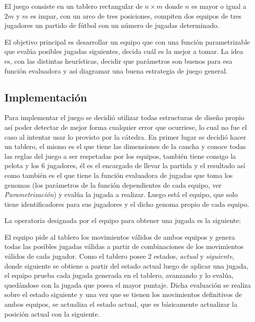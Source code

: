 
El juego consiste en un tablero rectangular de $n \times m$ donde $n$ es mayor o
igual a $2m$ y $m$ es impar, con un arco de tres posiciones, compiten dos
equipos de tres jugadores un partido de fútbol con un número de jugadas
determinado.


El objetivo principal es desarrollar un equipo que con una función parametrizable
que evalúa posibles jugadas siguientes, decida cuál es la mejor a tomar.
La idea es, con las distintas heurísticas, decidir que parámetros son buenos para esa
función evaluadora y así diagramar una buena estrategia de juego general.\\

\subsection{Implementación}


Para implementar el juego se decidió utilizar todas estructuras de diseño propio
así poder detectar de mejor forma cualquier error que ocurriese, lo cual no fue
el caso al intentar usar lo provisto por la cátedra. En primer lugar se decidió
hacer un tablero, el mismo es el que tiene las dimensiones de la cancha y conoce
todas las reglas del juego a ser respetadas por los equipos, también tiene
consigo la pelota y los 6 jugadores, él es el encargado de llevar la partida y
el resultado así como también es el que tiene la función evaluadora de jugadas
que toma los genomas (los parámetros de la función dependientes de cada equipo,
ver {\it Parametrización\/}) y evalúa la jugada a realizar. Luego está el
equipo, que solo tiene identificadores para sus jugadores y el dicho genoma
propio de cada equipo.


La operatoria designada por el equipo para obtener una jugada es la siguiente:

El equipo pide al tablero los movimientos válidos de ambos equipos y genera todas las
posibles jugadas válidas a partir de combinaciones de los movimientos válidos de
cada jugador. Como el tablero posee 2 estados, {\it actual\/} y {\it
  siguiente}, donde siguiente se obtiene a partir del estado actual luego de
aplicar una jugada, el equipo prueba cada jugada generada en el tablero,
avanzando y lo evalúa, quedándose con la jugada que posea el mayor
puntaje. Dicha evaluación se realiza sobre el estado siguiente y una vez que se
tienen los movimientos definitivos de ambos equipos, se actualiza el estado
actual, que es básicamente actualizar la posición actual con la siguiente.

